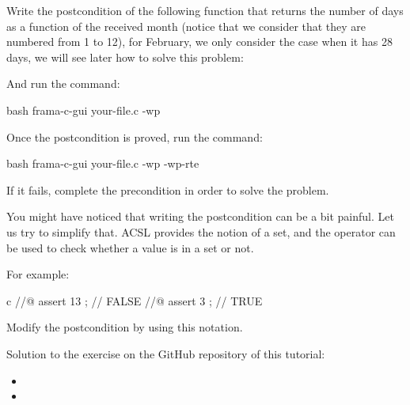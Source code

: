 




Write the postcondition of the following function that returns the number
of days as a function of the received month (notice that we consider that
they are numbered from 1 to 12), for February, we only consider the case
when it has 28 days, we will see later how to solve this problem:





And run the command:


\begin{CodeBlock}{bash}
frama-c-gui your-file.c -wp
\end{CodeBlock}


Once the postcondition is proved, run the command:



\begin{CodeBlock}{bash}
frama-c-gui your-file.c -wp -wp-rte
\end{CodeBlock}



If it fails, complete the precondition in order to solve the problem.



You might have noticed that writing the postcondition can be a bit painful.
Let us try to simplify that. ACSL provides the notion of a set, and the operator
 can be used to check whether a value is
in a set or not.


For example:


\begin{CodeBlock}{c}
//@ assert 13  ; // FALSE
//@ assert 3   ; // TRUE
\end{CodeBlock}



Modify the postcondition by using this notation.


\begin{Information}
  Solution to the exercise on the GitHub repository of this tutorial:
  \begin{itemize}
    \item {}
    \item {}
  \end{itemize}
\end{Information}


